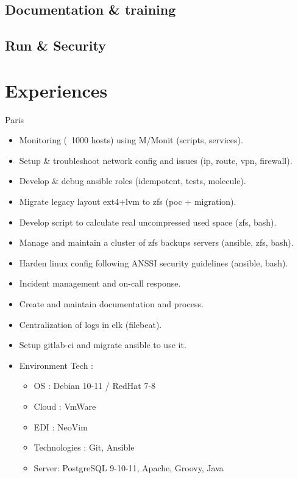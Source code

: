 \documentclass[10pt,a4paper,sans]{moderncv}
\begin{document}
\subsection{Documentation \& training}

\subsection{Run \& Security}

\section{Experiences}

{Paris}{
  \begin{itemize}%
    \item Monitoring (~1000 hosts) using M/Monit (scripts, services).
    \item Setup \& troubleshoot network config and issues (ip, route, vpn, firewall).
    \item Develop \& debug ansible roles (idempotent, tests, molecule).
    \item Migrate legacy layout ext4+lvm to zfs (poc + migration).
    \item Develop script to calculate real uncompressed used space (zfs, bash).
    \item Manage and maintain a cluster of zfs backups servers (ansible, zfs, bash).
    \item Harden linux config following ANSSI security guidelines (ansible, bash).
    \item Incident management and on-call response.
    \item Create and maintain documentation and process.
    \item Centralization of logs in elk (filebeat).
    \item Setup gitlab-ci and migrate ansible to use it.
    \item Environment Tech :
      \begin{itemize}%
        \item OS : Debian 10-11 / RedHat 7-8
        \item Cloud : VmWare
        \item EDI : NeoVim
        \item Technologies : Git, Ansible
        \item Server: PostgreSQL 9-10-11, Apache, Groovy, Java
      \end{itemize}
  \end{itemize}}
\end{document}
